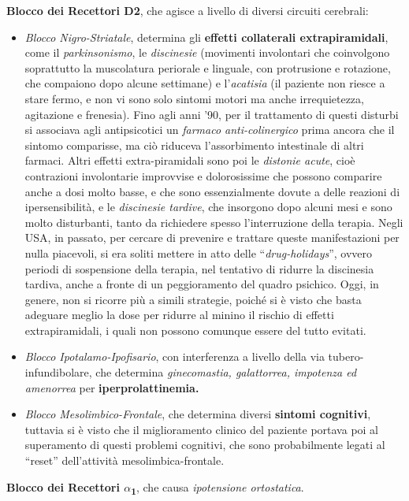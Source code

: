\textbf{Blocco dei Recettori D2}, che agisce a livello di diversi
circuiti cerebrali:

\begin{itemize}
\item
  \emph{Blocco Nigro-Striatale}, determina gli \textbf{effetti
  collaterali extrapiramidali}, come il \emph{parkinsonismo}, le
  \emph{discinesie} (movimenti involontari che coinvolgono soprattutto
  la muscolatura periorale e linguale, con protrusione e rotazione, che
  compaiono dopo alcune settimane) e l'\emph{acatisia} (il paziente non
  riesce a stare fermo, e non vi sono solo sintomi motori ma anche
  irrequietezza, agitazione e frenesia). Fino agli anni '90, per il
  trattamento di questi disturbi si associava agli antipsicotici un
  \emph{farmaco anti-colinergico} prima ancora che il sintomo
  comparisse, ma ciò riduceva l'assorbimento intestinale di altri
  farmaci. Altri effetti extra-piramidali sono poi le \emph{distonie
  acute}, cioè contrazioni involontarie improvvise e dolorosissime che
  possono comparire anche a dosi molto basse, e che sono essenzialmente
  dovute a delle reazioni di ipersensibilità, e le \emph{discinesie
  tardive}, che insorgono dopo alcuni mesi e sono molto disturbanti,
  tanto da richiedere spesso l'interruzione della terapia. Negli USA, in
  passato, per cercare di prevenire e trattare queste manifestazioni per
  nulla piacevoli, si era soliti mettere in atto delle
  ``\emph{drug-holidays}'', ovvero periodi di sospensione della terapia,
  nel tentativo di ridurre la discinesia tardiva, anche a fronte di un
  peggioramento del quadro psichico. Oggi, in genere, non si ricorre più
  a simili strategie, poiché si è visto che basta adeguare meglio la
  dose per ridurre al minino il rischio di effetti extrapiramidali, i
  quali non possono comunque essere del tutto evitati.
\item
  \emph{Blocco Ipotalamo-Ipofisario}, con interferenza a livello della
  via tubero-infundibolare, che determina \emph{ginecomastia,
  galattorrea, impotenza ed amenorrea} per \textbf{iperprolattinemia.}
\item
  \emph{Blocco Mesolimbico-Frontale}, che determina diversi
  \textbf{sintomi cognitivi}, tuttavia si è visto che il miglioramento
  clinico del paziente portava poi al superamento di questi problemi
  cognitivi, che sono probabilmente legati al ``reset'' dell'attività
  mesolimbica-frontale.
\end{itemize}

\textbf{Blocco dei Recettori $\alpha$\textsubscript{1}}, che causa
\emph{ipotensione ortostatica}.

